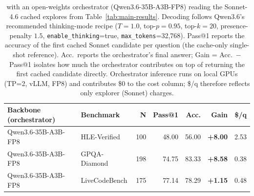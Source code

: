 \begin{table}[H]
\centering
\caption{\our{} with an open-weights orchestrator (Qwen3.6-35B-A3B-FP8) reading the Sonnet-4.6 cached explores from Table~\ref{tab:main-results}. Decoding follows Qwen3.6's recommended thinking-mode recipe ($T{=}1.0$, top-$p{=}0.95$, top-$k{=}20$, presence-penalty $1.5$, \texttt{enable\_thinking}{=}true, \texttt{max\_tokens}{=}32{,}768). Pass@1 reports the accuracy of the first cached Sonnet candidate per question (the cache-only single-shot reference). Acc.\ reports the orchestrator's final answer; Gain = Acc.\ $-$ Pass@1 isolates how much the orchestrator contributes on top of returning the first cached candidate directly. Orchestrator inference runs on local GPUs (TP=2, vLLM, FP8) and contributes \$0 to the cost column; \$/q therefore reflects only explorer (Sonnet) charges.}
\label{tab:qwen36-baseline}
\small
\setlength{\tabcolsep}{3pt}
\begin{tabular}{l l r r r r r}
\toprule
Backbone (orchestrator) & Benchmark & N & Pass@1 & Acc. & Gain & \$/q \\
\midrule
Qwen3.6-35B-A3B-FP8 & HLE-Verified  & 100 & 48.00 & 56.00 & \textbf{+8.00}  & 2.53 \\
Qwen3.6-35B-A3B-FP8 & GPQA-Diamond  & 198 & 74.75 & 83.33 & \textbf{+8.58}  & 0.38 \\
Qwen3.6-35B-A3B-FP8 & LiveCodeBench & 175 & 77.14 & 78.29 & \textbf{+1.15}  & 0.48 \\
\bottomrule
\end{tabular}
\end{table}

